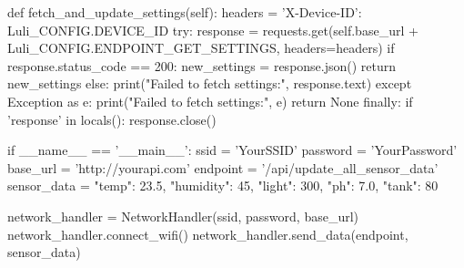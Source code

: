 \documentclass[12pt]{article} %
\begin{document}
\begin{pythoncode}[caption={Pico W Network Handler Code}]
        def fetch_and_update_settings(self):
            headers = {'X-Device-ID': Luli_CONFIG.DEVICE_ID}
            try:
                response = requests.get(self.base_url + Luli_CONFIG.ENDPOINT_GET_SETTINGS, headers=headers)
                if response.status_code == 200:
                    new_settings = response.json()
                    return new_settings
                else:
                    print("Failed to fetch settings:", response.text)
            except Exception as e:
                print("Failed to fetch settings:", e)
                return None
            finally:
                if 'response' in locals():
                    response.close()
    
        
    
    if __name__ == '__main__':
        ssid = 'YourSSID'
        password = 'YourPassword'
        base_url = 'http://yourapi.com'
        endpoint = '/api/update_all_sensor_data'
        sensor_data = {
            "temp": 23.5,
            "humidity": 45,
            "light": 300,
            "ph": 7.0,
            "tank": 80
        }
    
        network_handler = NetworkHandler(ssid, password, base_url)
        network_handler.connect_wifi()
        network_handler.send_data(endpoint, sensor_data)
    
    
\end{pythoncode}
\end{document}
